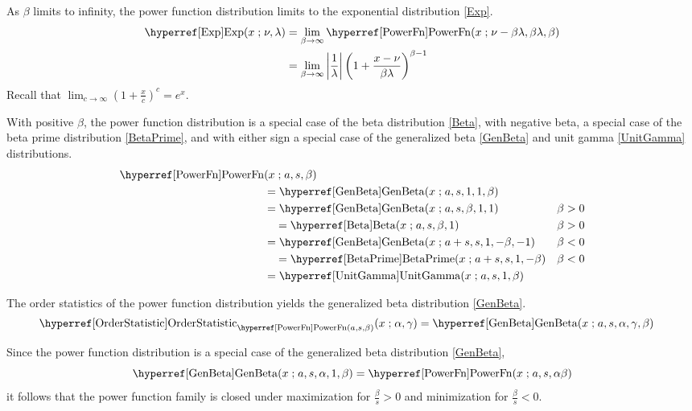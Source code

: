 As $\beta$ limits to infinity, the power function distribution limits to the exponential distribution \eqref{Exp}.
\begin{align*}
\opr{Exp}(x\given \nu,\lambda) &=  \lim_{\beta\rightarrow\infty} \opr{PowerFn} (x\given \nu-\beta\lambda,\beta\lambda,\beta) \checked \\
	&=  \lim_{\beta\rightarrow\infty}  \left|\frac{1}{ \lambda}\right| \left(1+\frac{x-\nu}{\beta\lambda} \right)^{\beta -1} 
	\checked
\end{align*}
Recall that $\lim_{c\rightarrow\infty} \left(1 + \frac{x}{c} \right)^{c} = e^x$. \checked



 

With positive $\beta$, the power function distribution is a special case of the beta distribution \eqref{Beta}, with negative beta, a special case of the beta prime distribution \eqref{BetaPrime}, and with either sign a special case of the generalized beta  \eqref{GenBeta} and unit gamma \eqref{UnitGamma} distributions.
\begin{align*}
	\opr{PowerFn}& (x\given a,s,\beta) 
\\ & = \opr{GenBeta}(x\given a,s , 1,1,\beta) \checked
\\ & = \opr{GenBeta}(x\given a,s , \beta,1,1) & \beta>0 \checked
\\ & \quad = \opr{Beta}(x\given a,s , \beta,1)  & 	\beta>0	\checked
\\ & = \opr{GenBeta}(x\given a+s,s ,1,-\beta,-1) & \beta<0\checked
\\ & \quad = \opr{BetaPrime}(x\given a+s,s , 1,-\beta)  & 	\beta<0\checked
\\ & = \opr{UnitGamma}(x\given a,s,1, \beta) \checked
\end{align*}


 

The order statistics  of the power function distribution yields the generalized beta distribution \eqref{GenBeta}.
\begin{align*}
\opr{OrderStatistic}_{\opr{PowerFn}(a,s,\beta)} &(x \given \alpha, \gamma)  = \opr{GenBeta}(x\given a, s, \alpha,\gamma, \beta) 
\checked
\end{align*}

Since the power function distribution is a special case of the generalized beta distribution \eqref{GenBeta},
\[
 \opr{GenBeta}(x\given a, s, \alpha,1, \beta) = \opr{PowerFn}(x\given a,s,\alpha\beta) \checked
\]
it follows that the power function family is closed under maximization for $\tfrac{\beta}{s} > 0$ and minimization for  $\tfrac{\beta}{s}<0$.



